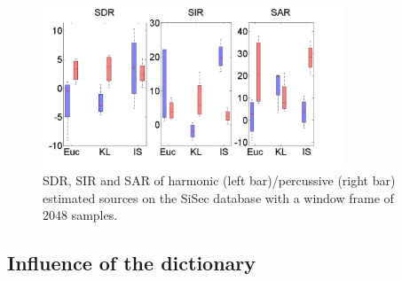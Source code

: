 \begin{figure}[t]

  \centering 
  \includegraphics[width=9cm]{fig/DivergenceFrame2048}
  \caption{\label{frame2048} SDR, SIR and SAR of harmonic (left bar)/percussive (right bar) estimated sources on the SiSec database with a window frame of $2048$ samples.}
  
\end{figure}



\subsection{Influence of the dictionary}
\label{setup:dictionary}


